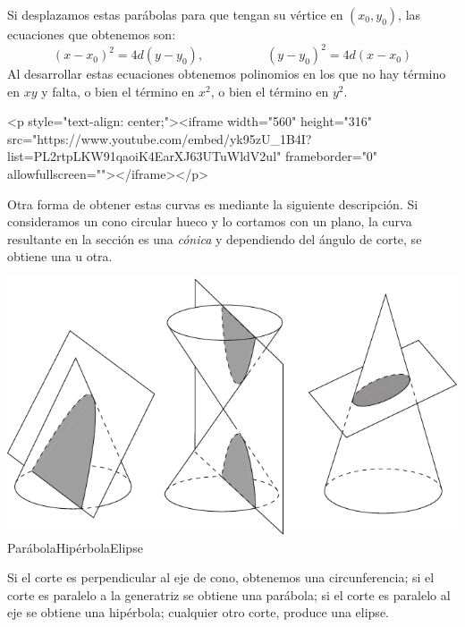 Si desplazamos estas parábolas para que tengan su vértice en $(x_0,y_0)$, las ecuaciones  que obtenemos son:
\[
(x-x_0)^2=4\mathit{d}(y-y_0),\hspace{5em} (y-y_0)^2=4\mathit{d}(x-x_0)
\]
Al desarrollar estas ecuaciones obtenemos polinomios en los que no hay término en $xy$ y falta, o bien el término en $x^2$, o bien el término en $y^2$.

\begin{rawhtml}
<p style="text-align: center;"><iframe width="560" height="316" src="https://www.youtube.com/embed/yk95zU_1B4I?list=PL2rtpLKW91qaoiK4EarXJ63UTuWldV2ul" frameborder="0" allowfullscreen=""></iframe></p>
\end{rawhtml}

Otra forma de obtener estas curvas es mediante la siguiente descripción.
Si consideramos un cono circular hueco y lo cortamos con un plano, la curva resultante en la
sección es una \emph{cónica} y
dependiendo del ángulo de corte, se obtiene una u otra.
%
\begin{center}
\includegraphics{T2/figs/conicas.pdf}\\
Parábola\qquad\qquad\qquad\qquad Hipérbola\qquad\qquad\qquad\qquad Elipse
\end{center}
%
Si el corte es perpendicular al eje de cono, obtenemos una circunferencia; si el corte es paralelo a la generatriz se obtiene una parábola; si el corte es paralelo al eje se obtiene una hipérbola; cualquier otro corte, produce una elipse.

